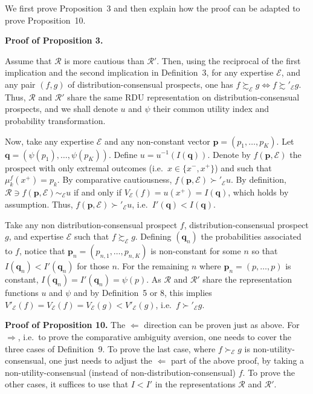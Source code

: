 \documentclass[12pt,a4paper]{article}
\newenvironment{original}
  {\par\noindent\ignorespaces}
  {\par}
\begin{document}
\begin{original}
We first prove Proposition~3 and then explain how the proof can be adapted to prove Proposition~10.

\textbf{Proof of Proposition 3.}

Assume that $\mathcal{R}$ is more cautious than $\mathcal{R}'$. Then, using the reciprocal of the first implication and the second implication in Definition~3, for any expertise $\mathcal{E}$, and any pair $(f, g)$ of distribution-consensual prospects, one has $f \succsim_{\mathcal{E}} g \iff f \succsim'_{\mathcal{E}} g$. Thus, $\mathcal{R}$ and $\mathcal{R}'$ share the same RDU representation on distribution-consensual prospects, and we shall denote $u$ and $\psi$ their common utility index and probability transformation.

Now, take any expertise $\mathcal{E}$ and any non-constant vector $\mathbf{p} = (p_{1}, \dots, p_{K})$. Let $\mathbf{q} = (\psi(p_{1}), \dots, \psi(p_{K}))$. Define $u = u^{-1}(I(\mathbf{q}))$. Denote by $f(\mathbf{p}, \mathcal{E})$ the prospect with only extremal outcomes (i.e.\ $x \in \{x^{-}, x^{+}\}$) and such that $\mu_{k}^{f}(x^{+}) = p_{k}$. By comparative cautiousness, $f(\mathbf{p}, \mathcal{E}) \succ'_{\mathcal{E}} u$. By definition, $\mathcal{R} \ni f(\mathbf{p}, \mathcal{E}) \sim_{\mathcal{E}} u$ if and only if $V_{\mathcal{E}}(f) = u(x^{+}) = I(\mathbf{q})$, which holds by assumption. Thus, $f(\mathbf{p}, \mathcal{E}) \succ'_{\mathcal{E}} u$, i.e.\ $I'(\mathbf{q}) < I(\mathbf{q})$.

Take any non distribution-consensual prospect $f$, distribution-consensual prospect $g$, and expertise $\mathcal{E}$ such that $f \succsim_{\mathcal{E}} g$. Defining $(\mathbf{q}_{n})$ the probabilities associated to $f$, notice that $\mathbf{p}_{n} = (p_{n,1}, \dots, p_{n,K})$ is non-constant for some $n$ so that $I(\mathbf{q}_{n}) < I'(\mathbf{q}_{n})$ for those $n$. For the remaining $n$ where $\mathbf{p}_{n} = (p, \dots, p)$ is constant, $I(\mathbf{q}_{n}) = I'(\mathbf{q}_{n}) = \psi(p)$. As $\mathcal{R}$ and $\mathcal{R}'$ share the representation functions $u$ and $\psi$ and by Definition~5 or 8, this implies $V'_{\mathcal{E}}(f) = V_{\mathcal{E}}(f) = V_{\mathcal{E}}(g) < V'_{\mathcal{E}}(g)$, i.e.\ $f \succ'_{\mathcal{E}} g$.

\textbf{Proof of Proposition 10.} The $\Leftarrow$ direction can be proven just as above. For $\Rightarrow$, i.e.\ to prove the comparative ambiguity aversion, one needs to cover the three cases of Definition~9. To prove the last case, where $f \succ_{\mathcal{E}} g$ is non-utility-consensual, one just needs to adjust the $\Leftarrow$ part of the above proof, by taking a non-utility-consensual (instead of non-distribution-consensual) $f$. To prove the other cases, it suffices to use that $I < I'$ in the representations $\mathcal{R}$ and $\mathcal{R}'$.
\end{original}
\end{document}
